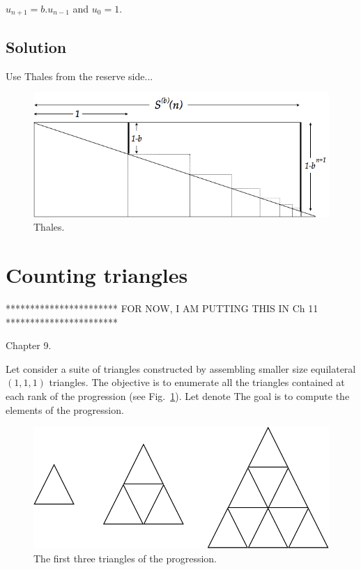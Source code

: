 \documentclass{article}[12pt]
\begin{document}
$u_{n+1} = b.u_{n−1}$ and $u_0 = 1$.

\subsection{Solution} 

Use Thales from the reserve side...
\begin{figure}[h]
\begin{center}
        \includegraphics[scale=0.4]{FiguresArithmetic/ThalesGeometricSumFinite} 
        \caption{Thales.}
\end{center}
\end{figure}



\section{Counting triangles}

***********************
FOR NOW, I AM PUTTING THIS IN Ch 11
***********************

Chapter 9.

Let consider a suite of triangles constructed by assembling smaller size equilateral $(1,1,1)$ triangles. 
The objective is to enumerate all the triangles contained at each rank of the progression
(see Fig.~\ref{fig:countingTriangles}). Let denote 
The goal is to compute the elements of the progression.
\begin{figure}[h]
\begin{center}
        \includegraphics[scale=0.4]{FiguresArithmetic/CountingTriangles} 
        \caption{The first three triangles of the progression.}
        \label{fig:countingTriangles}
\end{center}
\end{figure}
\end{document}
